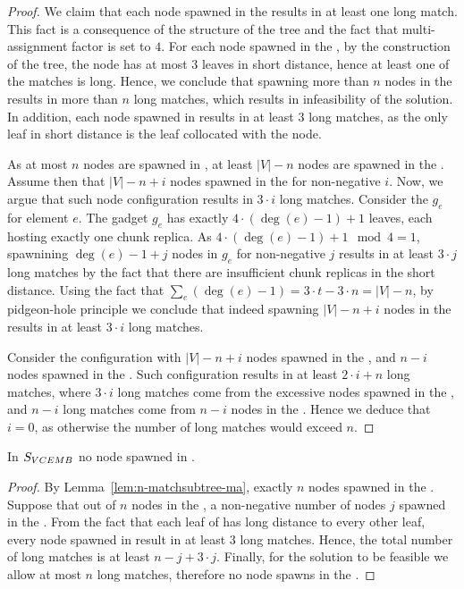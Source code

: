\begin{proof}
 We claim that each node spawned in the \MatchSubtree{} results in at least one long match.
This fact is a consequence of the structure of the tree and the fact that multi-assignment factor is set to $4$.
For each node spawned in the \MatchSubtree{}, by the construction of the tree, the node has at most $3$ leaves in short distance, hence at least one of the matches is long.
Hence, we conclude that spawning more than $n$ nodes in the \MatchSubtree{} results in more than $n$ long matches, which results in infeasibility of the solution.
In addition, each node spawned in \UnqGadget{} results in at least $3$ long matches, as the only leaf in short distance is the leaf collocated with the node.

As at most $n$ nodes are spawned in \MatchSubtree{}, at least $|V|-n$ nodes are spawned in the \CoverSubtree.
Assume then that $|V|-n+i$ nodes spawned in the \CoverSubtree{} for non-negative $i$.
Now, we argue that such node configuration results in $3\cdot i$ long matches.
Consider the \ElGadget{} $g_e$ for element $e$.
The gadget $g_e$ has exactly $4\cdot(\deg(e)-1)+1$ leaves, each hosting exactly one chunk replica.
As $4\cdot(\deg(e)-1)+1 \mod 4 = 1$, spawnining $\deg(e)-1+j$ nodes in $g_e$ for non-negative $j$ results in at least $3\cdot j$ long matches by the fact that there are insufficient chunk replicas in the short distance.
Using the fact that $\sum_e(\deg(e)-1) = 3\cdot t - 3\cdot n = |V| - n$, by pidgeon-hole principle we conclude that indeed spawning $|V|-n+i$ nodes in the \CoverSubtree{} results in at least $3\cdot i$ long matches.

Consider the configuration with $|V|-n+i$ nodes spawned in the \CoverSubtree{}, and $n-i$ nodes spawned in the \MatchSubtree{}.
Such configuration results in at least $2\cdot i + n$ long matches, where $3\cdot i$ long matches come from the excessive nodes spawned in the \CoverSubtree{}, and $n-i$ long matches come from $n-i$ nodes in the \MatchSubtree{}.
Hence we deduce that $i = 0$, as otherwise the number of long matches would exceed $n$.

\end{proof}

\begin{lemma}
  In $S_{VCEMB}$ no node spawned in \UnqGadget{}.
  \label{lem:no-unq-ma}
\end{lemma}
\begin{proof}
  By Lemma~\ref{lem:n-matchsubtree-ma}, exactly $n$ nodes spawned in the \MatchSubtree{}.
Suppose that out of $n$ nodes in the \MatchSubtree{}, a non-negative number of nodes $j$ spawned in the \UnqGadgets{}.
From the fact that each leaf of \UnqGadget{} has long distance to every other leaf, every node spawned in \UnqGadget{} result in at least $3$ long matches.
Hence, the total number of long matches is at least $n-j + 3\cdot j$.
Finally, for the solution to be feasible we allow at most $n$ long matches, therefore no node spawns in the \UnqGadget{}.
\end{proof}

